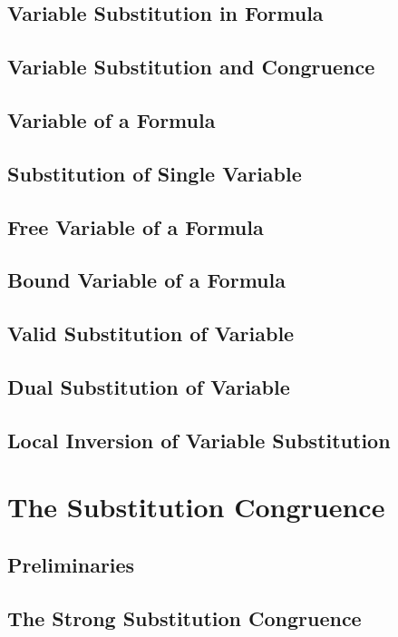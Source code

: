 \documentclass{report}
\begin{document}
    \subsection{Variable Substitution in Formula}
    \subsection{Variable Substitution and Congruence}
    \subsection{Variable of a Formula}
    \subsection{Substitution of Single Variable}
    \subsection{Free Variable of a Formula}
    \subsection{Bound Variable of a Formula}
    \subsection{Valid Substitution of Variable}
    \subsection{Dual Substitution of Variable}
    \subsection{Local Inversion of Variable Substitution}
\section{The Substitution Congruence}
    \subsection{Preliminaries}
    \subsection{The Strong Substitution Congruence}
\end{document}
